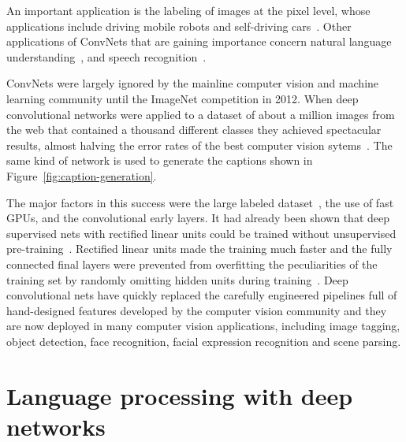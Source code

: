 \documentclass[10pts]{article}
\begin{document}
An important application is the labeling of images at the pixel level,
whose applications include driving mobile robots and self-driving
cars~\cite{hadsell-jfr-09,farabet-icml-12}. Other applications of ConvNets that are gaining importance concern
natural language understanding~\citep{collobert:2011b}, and speech
recognition~\cite{Sainath-et-al-ICASSP2013}.

ConvNets were largely ignored by the mainline computer vision and machine
learning community until the ImageNet competition in 2012.
When deep convolutional networks were applied to a dataset of about a
million images from the web that contained a thousand different classes
they achieved spectacular results, almost halving the error rates of the
best computer vision sytems~\citep{Krizhevsky-2012-small}.  
The same kind of network is used to generate the captions shown in Figure~\ref{fig:caption-generation}.

The major factors in this
success were the large labeled dataset~\citep{imagenet_cvpr09}, the use of fast GPUs,
and the convolutional early layers.  
It had already been shown that deep
supervised nets with rectified linear units could be trained without
unsupervised pre-training~\citep{Glorot+al-AI-2011-small}. 
Rectified linear units made the
training much faster and the fully connected final layers were prevented
from overfitting the peculiarities of the training set by randomly omitting
hidden units during training~\citep{Srivastava14}. Deep convolutional nets
have quickly replaced the carefully engineered pipelines full of
hand-designed features developed by the computer vision community and they
are now deployed in many computer vision applications, including image
tagging, object detection, face recognition, facial expression recognition
and scene parsing. 

\section{Language processing with deep networks}
\end{document}
